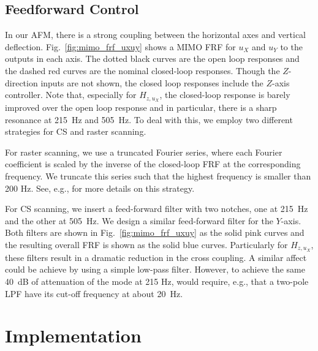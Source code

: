 \documentclass[twocolumn,oneside]{IEEEtran/IEEEtran}
\begin{document}

\subsection{Feedforward Control}\label{sec:ff_control}
In our AFM, there is a strong coupling between the horizontal axes and vertical deflection. Fig.~\ref{fig:mimo_frf_uxuy} shows a MIMO FRF for $u_X$ and $u_Y$ to the outputs in each axis. The dotted black curves are the open loop responses and the dashed red curves are the nominal closed-loop responses. Though the $Z$-direction inputs are not shown, the closed loop responses include the $Z$-axis controller. Note that, especially for $H_{z,u_X}$, the closed-loop response is barely improved over the open loop response and in particular, there is a sharp resonance at 215~Hz and 505~Hz. To deal with this, we employ two different strategies for CS and raster scanning.

For raster scanning, we use a truncated Fourier series, where each Fourier coefficient is scaled by the inverse of the closed-loop FRF at the corresponding frequency. We truncate this series such that the highest frequency is smaller than 200 Hz. See, e.g., \cite{clayton_review_2009} for more details on this strategy.

For CS scanning, we insert a feed-forward filter with two notches, one at 215~Hz and the other at 505~Hz. We design a similar feed-forward filter for the $Y$-axis. Both filters are shown in Fig.~\ref{fig:mimo_frf_uxuy} as the solid pink curves and the resulting overall FRF is shown as the solid blue curves. Particularly for $H_{z,u_X}$, these filters result in a dramatic reduction in the cross coupling. A similar affect could be achieve by using a simple low-pass filter. However, to achieve the same 40~dB of attenuation of the mode at 215 Hz, would require, e.g., that a two-pole LPF have its cut-off frequency at about 20~Hz. 

\section{Implementation}\label{sec:implementation}
	
\end{document}

